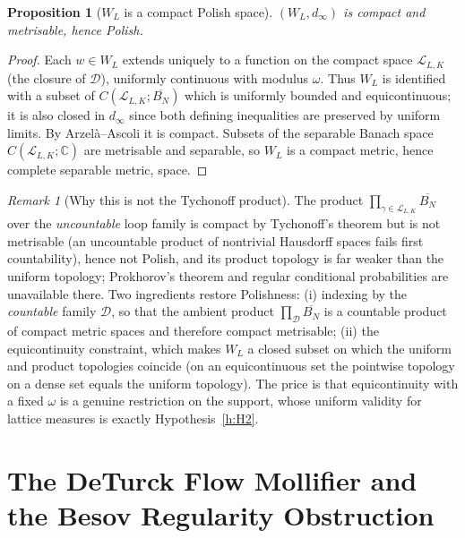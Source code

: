 \documentclass[11pt,a4paper]{article}
\newtheorem{proposition}[theorem]{Proposition}
\theoremstyle{definition}
\theoremstyle{remark}
\newtheorem{remark}[theorem]{Remark}
\begin{document}
\begin{proposition}[$W_L$ is a compact Polish space]\label{prop:polish}
$(W_L,d_\infty)$ is compact and metrisable, hence Polish.
\end{proposition}
\begin{proof}
Each $w\in W_L$ extends uniquely to a function on the compact space $\mathcal L_{L,K}$ (the closure of $\mathcal D$), uniformly continuous with modulus $\omega$. Thus $W_L$ is identified with a subset of $C(\mathcal L_{L,K};\overline{B_N})$ which is uniformly bounded and equicontinuous; it is also closed in $d_\infty$ since both defining inequalities are preserved by uniform limits. By Arzel\`a--Ascoli it is compact. Subsets of the separable Banach space $C(\mathcal L_{L,K};\mathbb C)$ are metrisable and separable, so $W_L$ is a compact metric, hence complete separable metric, space.
\end{proof}

\begin{remark}[Why this is not the Tychonoff product]
The product $\prod_{\gamma\in\mathcal L_{L,K}}\overline{B_N}$ over the \emph{uncountable} loop family is compact by Tychonoff's theorem but is not metrisable (an uncountable product of nontrivial Hausdorff spaces fails first countability), hence not Polish, and its product topology is far weaker than the uniform topology; Prokhorov's theorem and regular conditional probabilities are unavailable there. Two ingredients restore Polishness: (i) indexing by the \emph{countable} family $\mathcal D$, so that the ambient product $\prod_{\mathcal D}\overline{B_N}$ is a countable product of compact metric spaces and therefore compact metrisable; (ii) the equicontinuity constraint, which makes $W_L$ a closed subset on which the uniform and product topologies coincide (on an equicontinuous set the pointwise topology on a dense set equals the uniform topology). The price is that equicontinuity with a fixed $\omega$ is a genuine restriction on the support, whose uniform validity for lattice measures is exactly Hypothesis~\ref{h:H2}.
\end{remark}

\section{The DeTurck Flow Mollifier and the Besov Regularity Obstruction}\label{sec:besov}
\end{document}
